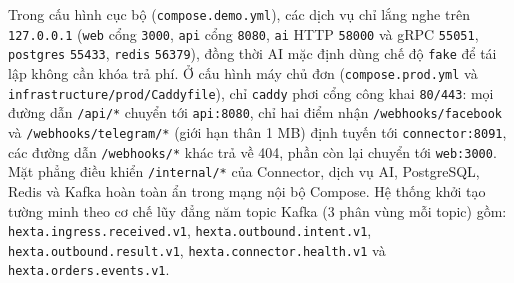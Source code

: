 Trong cấu hình cục bộ (\texttt{compose.\hspace{0pt}demo.\hspace{0pt}yml}), các dịch vụ chỉ lắng nghe trên \texttt{127.0.0.1} (\texttt{web} cổng \texttt{3000}, \texttt{api} cổng \texttt{8080},
\texttt{ai} HTTP \texttt{58000} và gRPC \texttt{55051}, \texttt{postgres} \texttt{55433}, \texttt{redis} \texttt{56379}), đồng thời AI mặc định dùng chế độ \texttt{fake} để
tái lập không cần khóa trả phí.
Ở cấu hình máy chủ đơn (\texttt{compose.\hspace{0pt}prod.\hspace{0pt}yml} và \texttt{infrastructure/\hspace{0pt}prod/\hspace{0pt}Caddyfile}), chỉ \texttt{caddy} phơi cổng công khai \texttt{80/443}: mọi đường dẫn
\texttt{/api/*} chuyển tới \texttt{api:8080}, chỉ hai điểm nhận \texttt{/webhooks/\hspace{0pt}facebook} và \texttt{/webhooks/\hspace{0pt}telegram/*} (giới hạn thân 1 MB) định tuyến tới
\texttt{connector:8091}, các đường dẫn \texttt{/webhooks/*} khác trả về 404, phần còn lại chuyển tới \texttt{web:3000}.
Mặt phẳng điều khiển \texttt{/internal/*} của Connector, dịch vụ AI, PostgreSQL, Redis và Kafka hoàn toàn ẩn trong mạng nội bộ Compose.
Hệ thống khởi tạo tường minh theo cơ chế lũy đẳng năm topic Kafka (3 phân vùng mỗi topic) gồm: \texttt{hexta.\hspace{0pt}ingress.\hspace{0pt}received.\hspace{0pt}v1}, \texttt{hexta.\hspace{0pt}outbound.\hspace{0pt}intent.\hspace{0pt}v1}, \texttt{hexta.\hspace{0pt}outbound.\hspace{0pt}result.\hspace{0pt}v1}, \texttt{hexta.\hspace{0pt}connector.\hspace{0pt}health.\hspace{0pt}v1} và \texttt{hexta.\hspace{0pt}orders.\hspace{0pt}events.\hspace{0pt}v1}.

